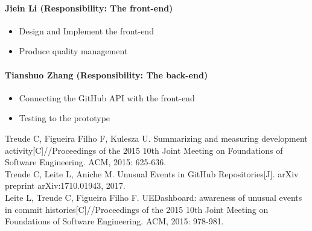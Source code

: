 \documentclass[conference]{IEEEtran}
\begin{document}
\paragraph{\textbf{Jiein Li (Responsibility: The front-end)}}
\medskip
\begin{itemize}
\item Design and Implement the front-end
\item Produce quality management
\end{itemize}
\bigskip

\paragraph{\textbf{Tianshuo Zhang (Responsibility: The back-end)}}
\medskip
\begin{itemize}
\item Connecting the GitHub API with the front-end
\item Testing to the prototype
\end{itemize}


\begin{thebibliography}{99}

 Treude C, Figueira Filho F, Kulesza U. Summarizing and measuring development activity[C]//Proceedings of the 2015 10th Joint Meeting on Foundations of Software Engineering. ACM, 2015: 625-636.\\

 Treude C, Leite L, Aniche M. Unusual Events in GitHub Repositories[J]. arXiv preprint arXiv:1710.01943, 2017.\\

 Leite L, Treude C, Figueira Filho F. UEDashboard: awareness of unusual events in commit histories[C]//Proceedings of the 2015 10th Joint Meeting on Foundations of Software Engineering. ACM, 2015: 978-981.\\


\end{thebibliography}
\end{document}
